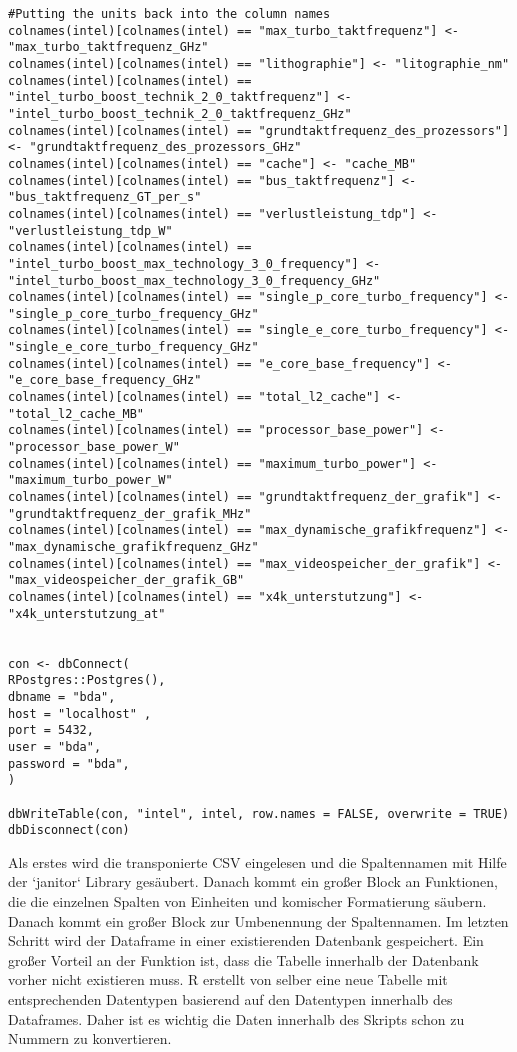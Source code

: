 \begin{lstlisting}[caption={\texttt{database.R}},captionpos=b]
#Putting the units back into the column names
colnames(intel)[colnames(intel) == "max_turbo_taktfrequenz"] <- "max_turbo_taktfrequenz_GHz"
colnames(intel)[colnames(intel) == "lithographie"] <- "litographie_nm"
colnames(intel)[colnames(intel) == "intel_turbo_boost_technik_2_0_taktfrequenz"] <- "intel_turbo_boost_technik_2_0_taktfrequenz_GHz"
colnames(intel)[colnames(intel) == "grundtaktfrequenz_des_prozessors"] <- "grundtaktfrequenz_des_prozessors_GHz"
colnames(intel)[colnames(intel) == "cache"] <- "cache_MB"
colnames(intel)[colnames(intel) == "bus_taktfrequenz"] <- "bus_taktfrequenz_GT_per_s"
colnames(intel)[colnames(intel) == "verlustleistung_tdp"] <- "verlustleistung_tdp_W"
colnames(intel)[colnames(intel) == "intel_turbo_boost_max_technology_3_0_frequency"] <- "intel_turbo_boost_max_technology_3_0_frequency_GHz"
colnames(intel)[colnames(intel) == "single_p_core_turbo_frequency"] <- "single_p_core_turbo_frequency_GHz"
colnames(intel)[colnames(intel) == "single_e_core_turbo_frequency"] <- "single_e_core_turbo_frequency_GHz"
colnames(intel)[colnames(intel) == "e_core_base_frequency"] <- "e_core_base_frequency_GHz"
colnames(intel)[colnames(intel) == "total_l2_cache"] <- "total_l2_cache_MB"
colnames(intel)[colnames(intel) == "processor_base_power"] <- "processor_base_power_W"
colnames(intel)[colnames(intel) == "maximum_turbo_power"] <- "maximum_turbo_power_W"
colnames(intel)[colnames(intel) == "grundtaktfrequenz_der_grafik"] <- "grundtaktfrequenz_der_grafik_MHz"
colnames(intel)[colnames(intel) == "max_dynamische_grafikfrequenz"] <- "max_dynamische_grafikfrequenz_GHz"
colnames(intel)[colnames(intel) == "max_videospeicher_der_grafik"] <- "max_videospeicher_der_grafik_GB"
colnames(intel)[colnames(intel) == "x4k_unterstutzung"] <- "x4k_unterstutzung_at"


con <- dbConnect(
RPostgres::Postgres(),
dbname = "bda",
host = "localhost" ,
port = 5432,
user = "bda",
password = "bda",
)

dbWriteTable(con, "intel", intel, row.names = FALSE, overwrite = TRUE)
dbDisconnect(con)
\end{lstlisting}

Als erstes wird die transponierte CSV eingelesen und die Spaltennamen mit Hilfe der `janitor` Library gesäubert. Danach kommt ein großer Block an Funktionen, die die einzelnen Spalten von Einheiten und komischer Formatierung säubern.
Danach kommt ein großer Block zur Umbenennung der Spaltennamen. 
Im letzten Schritt wird der Dataframe in einer existierenden Datenbank gespeichert. 
Ein großer Vorteil an der Funktion ist, dass die Tabelle innerhalb der Datenbank vorher nicht existieren muss. 
R erstellt von selber eine neue Tabelle mit entsprechenden Datentypen basierend auf den Datentypen innerhalb des Dataframes. Daher ist es wichtig die Daten innerhalb des Skripts schon zu Nummern zu konvertieren.

